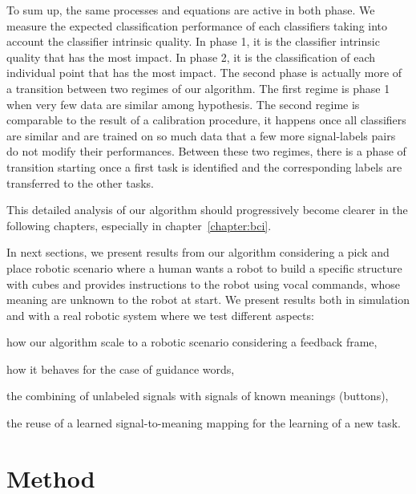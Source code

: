 To sum up, the same processes and equations are active in both phase. We measure the expected classification performance of each classifiers taking into account the classifier intrinsic quality. In phase 1, it is the classifier intrinsic quality that has the most impact. In phase 2, it is the classification of each individual point that has the most impact. The second phase is actually more of a transition between two regimes of our algorithm. The first regime is phase 1 when very few data are similar among hypothesis. The second regime is comparable to the result of a calibration procedure, it happens once all classifiers are similar and are trained on so much data that a few more signal-labels pairs do not modify their performances. Between these two regimes, there is a phase of transition starting once a first task is identified and the corresponding labels are  transferred to the other tasks.

This detailed analysis of our algorithm should progressively become clearer in the following chapters, especially in chapter~\ref{chapter:bci}.

\transition

In next sections, we present results from our algorithm considering a pick and place robotic scenario where a human wants a robot to build a specific structure with cubes and provides instructions to the robot using vocal commands, whose meaning are unknown to the robot at start. We present results both in simulation and with a real robotic system where we test different aspects: \begin{inparaenum}[(a)] \item how our algorithm scale to a robotic scenario considering a feedback frame, \item how it behaves for the case of guidance words, \item the combining of unlabeled signals with signals of known meanings (buttons), \item the reuse of a learned signal-to-meaning mapping for the learning of a new task. \end{inparaenum}

\section{Method}

